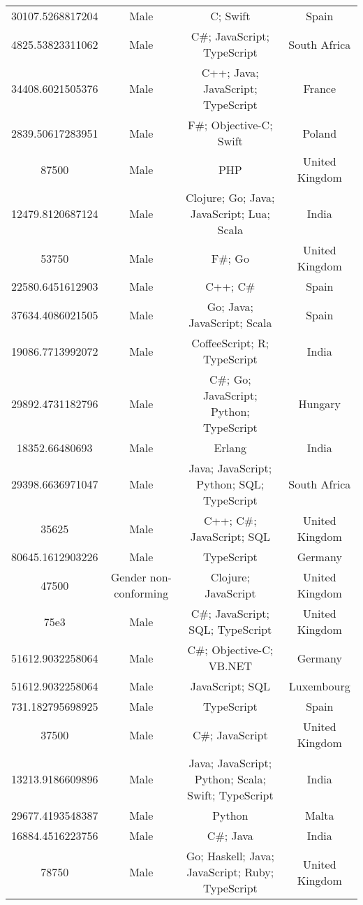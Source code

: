 \begin{center}
\begin{tabular}{ |c|c|c|c| }
30107.5268817204  &  Male  &  C; Swift  &  Spain  \\ 
4825.53823311062  &  Male  &  C\#; JavaScript; TypeScript  &  South Africa  \\ 
34408.6021505376  &  Male  &  C++; Java; JavaScript; TypeScript  &  France  \\ 
2839.50617283951  &  Male  &  F\#; Objective-C; Swift  &  Poland  \\ 
87500  &  Male  &  PHP  &  United Kingdom  \\ 
12479.8120687124  &  Male  &  Clojure; Go; Java; JavaScript; Lua; Scala  &  India  \\ 
53750  &  Male  &  F\#; Go  &  United Kingdom  \\ 
22580.6451612903  &  Male  &  C++; C\#  &  Spain  \\ 
37634.4086021505  &  Male  &  Go; Java; JavaScript; Scala  &  Spain  \\ 
19086.7713992072  &  Male  &  CoffeeScript; R; TypeScript  &  India  \\ 
29892.4731182796  &  Male  &  C\#; Go; JavaScript; Python; TypeScript  &  Hungary  \\ 
18352.66480693  &  Male  &  Erlang  &  India  \\ 
29398.6636971047  &  Male  &  Java; JavaScript; Python; SQL; TypeScript  &  South Africa  \\ 
35625  &  Male  &  C++; C\#; JavaScript; SQL  &  United Kingdom  \\ 
80645.1612903226  &  Male  &  TypeScript  &  Germany  \\ 
47500  &  Gender non-conforming  &  Clojure; JavaScript  &  United Kingdom  \\ 
75e3  &  Male  &  C\#; JavaScript; SQL; TypeScript  &  United Kingdom  \\ 
51612.9032258064  &  Male  &  C\#; Objective-C; VB.NET  &  Germany  \\ 
51612.9032258064  &  Male  &  JavaScript; SQL  &  Luxembourg  \\ 
731.182795698925  &  Male  &  TypeScript  &  Spain  \\ 
37500  &  Male  &  C\#; JavaScript  &  United Kingdom  \\ 
13213.9186609896  &  Male  &  Java; JavaScript; Python; Scala; Swift; TypeScript  &  India  \\ 
29677.4193548387  &  Male  &  Python  &  Malta  \\ 
16884.4516223756  &  Male  &  C\#; Java  &  India  \\ 
78750  &  Male  &  Go; Haskell; Java; JavaScript; Ruby; TypeScript  &  United Kingdom  \\ 

\end{tabular}
\end{center}
